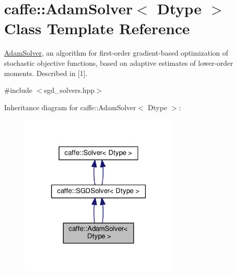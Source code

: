 \hypertarget{classcaffe_1_1_adam_solver}{}\section{caffe\+:\+:Adam\+Solver$<$ Dtype $>$ Class Template Reference}
\label{classcaffe_1_1_adam_solver}


\mbox{\hyperlink{classcaffe_1_1_adam_solver}{Adam\+Solver}}, an algorithm for first-\/order gradient-\/based optimization of stochastic objective functions, based on adaptive estimates of lower-\/order moments. Described in \mbox{[}1\mbox{]}.  




{\ttfamily \#include $<$sgd\+\_\+solvers.\+hpp$>$}



Inheritance diagram for caffe\+:\+:Adam\+Solver$<$ Dtype $>$\+:
\nopagebreak
\begin{figure}[H]
\begin{center}
\leavevmode
\includegraphics[width=218pt]{classcaffe_1_1_adam_solver__inherit__graph}
\end{center}
\end{figure}
